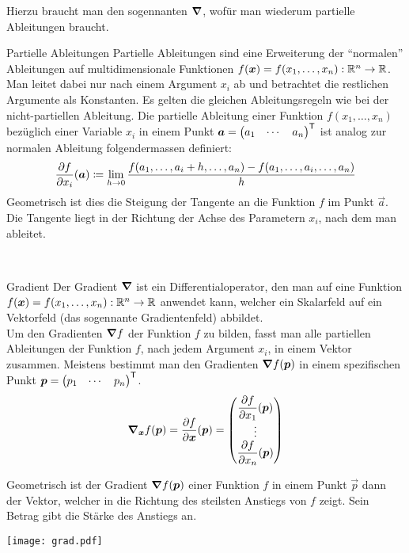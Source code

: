 Hierzu braucht man den sogennanten  $\bm{\nabla}$, wofür man wiederum partielle Ableitungen braucht.
\para{}
\begin{defbox}{Partielle Ableitungen}\label{ref:partielle_ableitungen}
  Partielle Ableitungen sind eine Erweiterung der ``normalen'' Ableitungen auf
  multidimensionale Funktionen $f(\bm{x}) = f(x_1,\ldots,x_n): \mathbb{R}^n \to \mathbb{R}$.
  Man leitet dabei nur nach einem Argument $x_i$ ab und betrachtet die restlichen Argumente als Konstanten.
  Es gelten die gleichen Ableitungsregeln wie bei der nicht-partiellen Ableitung.
  Die partielle Ableitung einer Funktion $f(x_1,\ldots,x_n)$ bezüglich einer
  Variable $x_i$ in einem Punkt $\bm{a} = \begin{pmatrix} a_1 & \cdots & a_n \end{pmatrix}^{\mathsf{T}}$
  ist analog zur normalen Ableitung folgendermassen definiert:
  \begin{equation*}
    \frac{\partial f}{\partial x_i}(\bm{a}) \coloneqq \lim_{h \to 0} \frac{f(a_1,\ldots,a_i + h,\ldots,a_n)-f(a_1,\ldots,a_i,\ldots,a_n)}{h}
  \end{equation*}
  Geometrisch ist dies die Steigung der Tangente an die Funktion $f$ im Punkt
  $\vec{a}$. Die Tangente liegt in der Richtung der Achse des Parametern $x_i$, nach dem man ableitet.
\end{defbox}
\\
\begin{defbox}{Gradient}
  Der Gradient $\bm{\nabla}$ ist ein Differentialoperator, den man auf eine
  Funktion $f(\bm{x}) = f(x_1,\ldots,x_n): \mathbb{R}^n \to \mathbb{R}$ anwendet kann, welcher ein Skalarfeld auf ein Vektorfeld (das sogennante Gradientenfeld) abbildet.\\
  Um den Gradienten $\bm{\nabla}f$ der Funktion $f$ zu bilden, fasst man alle partiellen Ableitungen der Funktion $f$, nach jedem
  Argument $x_i$, in einem Vektor zusammen. Meistens bestimmt man den Gradienten
  $\bm{\nabla} f(\bm{p})$ in einem spezifischen Punkt $\bm{p} =
  \begin{pmatrix} p_1 & \cdots & p_n \end{pmatrix}^{\mathsf{T}}$.
  \begin{equation*}
    \bm{\nabla}_{\bm{x}} f(\bm{p}) = \displaystyle\frac{\partial f}{\partial \bm{x}}(\bm{p}) =
    \begin{pmatrix}
      \displaystyle\frac{\partial f}{\partial x_1}(\bm{p}) \\
      \vdots \\
      \displaystyle\frac{\partial f}{\partial x_n}(\bm{p}) \\
    \end{pmatrix}
  \end{equation*}

  Geometrisch ist der Gradient $\bm{\nabla}f(\bm{p})$ einer Funktion $f$ in
  einem Punkt $\vec{p}$ dann der Vektor, welcher in die Richtung des steilsten
  Anstiegs von $f$ zeigt. Sein Betrag gibt die Stärke des Anstiegs an.
  \para{}
  \begin{center}
    \texttt{[image: grad.pdf]}
  \end{center}
\end{defbox}
